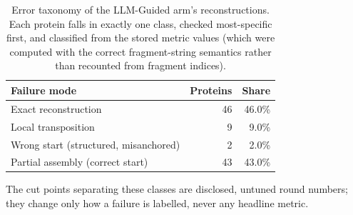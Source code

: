 \begin{table}[htbp]
  \centering
  \caption{Error taxonomy of the LLM-Guided arm's reconstructions. Each protein falls in exactly one class, checked most-specific first, and classified from the stored metric values (which were computed with the correct fragment-string semantics rather than recounted from fragment indices).}
  \label{tab:error_taxonomy}
  \begin{tabular}{lrr}
    \toprule
    Failure mode & Proteins & Share \\
    \midrule
    Exact reconstruction & 46 & 46.0\% \\
    Local transposition & 9 & 9.0\% \\
    Wrong start (structured, misanchored) & 2 & 2.0\% \\
    Partial assembly (correct start) & 43 & 43.0\% \\
    \bottomrule
  \end{tabular}
  \par\smallskip\footnotesize{The cut points separating these classes are disclosed, untuned round numbers; they change only how a failure is labelled, never any headline metric.}
\end{table}
